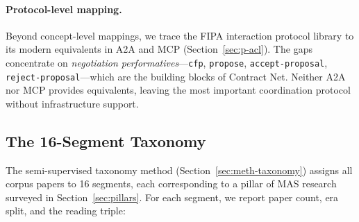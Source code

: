 \documentclass{article}
\begin{document}
\paragraph{Protocol-level mapping.}
Beyond concept-level mappings, we trace the FIPA interaction protocol library to
its modern equivalents in A2A and MCP (Section~\ref{sec:p-acl}). The gaps concentrate
on \emph{negotiation performatives}---\texttt{cfp}, \texttt{propose},
\texttt{accept-proposal}, \texttt{reject-proposal}---which are the building blocks
of Contract Net. Neither A2A nor MCP provides equivalents, leaving the most important
coordination protocol without infrastructure support.

\subsection{The 16-Segment Taxonomy}
\label{sec:res-taxonomy}

%
%
%
%

The semi-supervised taxonomy method (Section~\ref{sec:meth-taxonomy}) assigns all
corpus papers to 16 segments, each corresponding to a pillar of MAS research surveyed
in Section~\ref{sec:pillars}. For each segment, we report paper count, era split,
and the reading triple:
\end{document}
